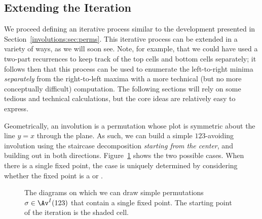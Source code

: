 \documentclass[12pt,twoside]{memoir}
\begin{document}
      

    \subsection{Extending the Iteration} 

      We proceed defining an iterative process similar to the development
      presented in Section~\ref{involutions:sec:perms}. 
      This iterative process can be extended in a variety of ways, as we will
      soon see. Note, for example, that we could have used a two-part recurrences
      to keep track of the top cells and bottom cells separately; it follows then
      that this process can be used to enumerate the left-to-right minima
      \emph{separately} from the right-to-left maxima with a more technical (but
      no more conceptually difficult) computation. The following sections will
      rely on some tedious and technical calculations, but the core ideas are
      relatively easy to express. 

      Geometrically, an involution is a permutation whose plot is symmetric about
      the line $y = x$ through the plane. As such, we can build a simple
      $123$-avoiding involution using the staircase decomposition \emph{starting
      from the center}, and building out in both directions.
      Figure~\ref{involutions:fig:staircase-center} shows the two possible cases.
      When there is a single fixed point, the case is uniquely determined by
      considering whether the fixed point is a \rtlmax{} or \ltrmin{}. 



      \begin{figure}[t]
      \centering
        \hspace{4pc}
        \caption[The diagrams on which we can draw simple permutations]{
          The diagrams on which we can draw simple permutations $\sigma
          \in \Av^I(123)$ that contain a single fixed point.  The starting point
          of the iteration is the shaded cell.}
        \label{involutions:fig:staircase-center}
      \end{figure}
    
\end{document}
